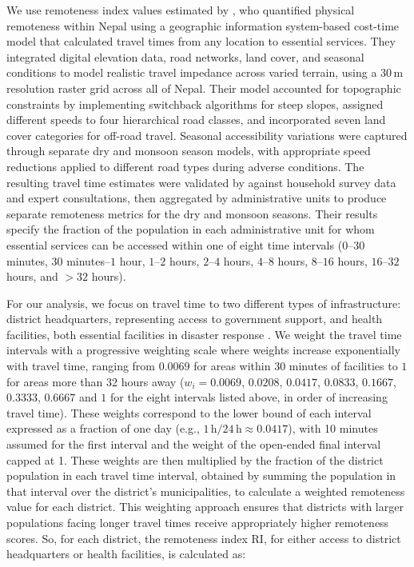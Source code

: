 \documentclass[preprint,12pt,authoryear]{elsarticle}
\begin{document}
We use remoteness index values estimated by \cite{banick2019}, who quantified physical remoteness within Nepal using a geographic information system-based cost-time model that calculated travel times from any location to essential services. They integrated digital elevation data, road networks, land cover, and seasonal conditions to model realistic travel impedance across varied terrain, using a $30\,\text{m}$ resolution raster grid across all of Nepal. Their model accounted for topographic constraints by implementing switchback algorithms for steep slopes, assigned different speeds to four hierarchical road classes, and incorporated seven land cover categories for off-road travel. Seasonal accessibility variations were captured through separate dry and monsoon season models, with appropriate speed reductions applied to different road types during adverse conditions. The resulting travel time estimates were validated by \cite{banick2019} against household survey data and expert consultations, then aggregated by administrative units to produce separate remoteness metrics for the dry and monsoon seasons. Their results specify the fraction of the population in each administrative unit for whom essential services can be accessed within one of eight time intervals ($0$--$30$ minutes, $30$ minutes--$1$ hour, $1$--$2$ hours, $2$--$4$ hours, $4$--$8$ hours, $8$--$16$ hours, $16$--$32$ hours, and $>32$ hours).

For our analysis, we focus on travel time to two different types of infrastructure: district headquarters, representing access to government support, and health facilities, both essential facilities in disaster response \citep{NationalPlanningCommission2015}. We weight the travel time intervals with a progressive weighting scale where weights increase exponentially with travel time, ranging from $0.0069$ for areas within 30 minutes of facilities to $1$ for areas more than 32 hours away ($w_i = 0.0069$, $0.0208$, $0.0417$, $0.0833$, $0.1667$, $0.3333$, $0.6667$ and $1$ for the eight intervals listed above, in order of increasing travel time). These weights correspond to the lower bound of each interval expressed as a fraction of one day (e.g., $1\,\text{h}/24\,\text{h} \approx 0.0417$), with 10 minutes assumed for the first interval and the weight of the open-ended final interval capped at 1. These weights are then multiplied by the fraction of the district population in each travel time interval, obtained by summing the population in that interval over the district's municipalities, to calculate a weighted remoteness value for each district. This weighting approach ensures that districts with larger populations facing longer travel times receive appropriately higher remoteness scores. So, for each district, the remoteness index $\text{RI}$, for either access to district headquarters or health facilities, is calculated as:
\end{document}
